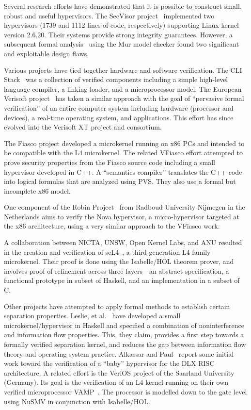 \documentclass[submission,copyright]{eptcs} \providecommand{\event}{ACL2 2011}
\begin{document}
Several research efforts have demonstrated that it is possible to
construct small, robust and useful hypervisors.  The SecVisor
project~\cite{SecVisor} implemented two hypervisors (1739 and 1112
lines of code, respectively) supporting Linux kernel version 2.6.20.
Their systems provide strong integrity guarantees.  However, a
subsequent formal analysis~\cite{Franklin08} using the Mur
model checker found two significant and exploitable design flaws.

Various projects have tied together hardware and software verification.  The
CLI Stack~\cite{CLIStack} was a collection of verified components
including a simple high-level language compiler, a linking loader, and
a microprocessor model.  The European Verisoft project~\cite{Verisoft}
has taken a similar approach with the goal of ``pervasive formal
verification'' of an entire computer system including hardware
(processor and devices), a real-time operating system, and
applications. This effort has since evolved into the Verisoft XT 
project and consortium.

The Fiasco project developed a microkernel running on x86 PCs and
intended to be compatible with the L4 microkernel.  The related
VFiasco effort attempted to prove security properties from the Fiasco
source code including a small hypervisor developed in C++.  A
``semantics compiler'' translates the C++ code into logical formulas
that are analyzed using PVS.  They also use a formal but incomplete
x86 model.~\cite{Hoffmann}

One component of the Robin Project~\cite{Nova} from Radboud University
Nijmegen in the Netherlands aims to verify the Nova hypervisor, a
micro-hypervisor targeted at the x86 architecture, using a very
similar approach to the VFiasco work.

A collaboration between NICTA, UNSW, Open Kernel Labs, and ANU resulted
in the creation and verification of seL4~\cite{seL4},
a third-generation L4 family microkernel. Their proof is done using
the Isabelle/HOL theorem prover, and involves proof of refinement
across three layers---an abstract specification, a functional
prototype in subset of Haskell, and an implementation in a subset of
C.

Other projects have attempted to apply formal methods to establish
certain separation properties.  Leslie, et al.~\cite{Leslie} have
developed a small microkernel/hypervisor in Haskell and specified a
combination of noninterference and information flow properties.  This,
they claim, provides a first step towards a formally verified
separation kernel, and reduces the gap between information flow theory
and operating system practice.  Alkassar and Paul~\cite{Alkassar}
report some initial work toward the verification of a ``baby''
hypervisor for the DLX RISC architecture.  A related effort is the
VeriOS project of the Saarland University (Germany).  Its goal is the
verification of an L4 kernel running on their own verified
microprocessor VAMP~\cite{VAMP}. The processor is modelled down to the
gate level using NuSMV in conjunction with Isabelle/HOL.
\end{document}
